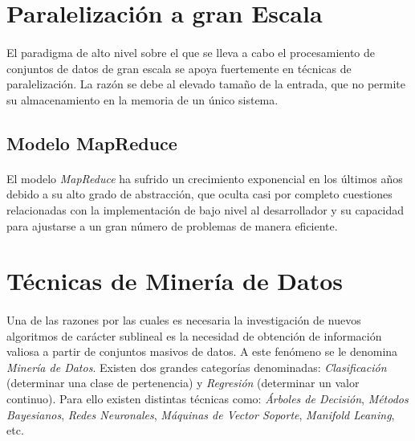 \documentclass[a4paper]{article}
\begin{document}
  \section{Paralelización a gran Escala}

    \paragraph{}
    El paradigma de alto nivel sobre el que se lleva a cabo el procesamiento de conjuntos de datos de gran escala se apoya fuertemente en técnicas de paralelización. La razón se debe al elevado tamaño de la entrada, que no permite su almacenamiento en la memoria de un único sistema.

    \subsection{Modelo MapReduce}

      \paragraph{}
      El modelo \emph{MapReduce} ha sufrido un crecimiento exponencial en los últimos años debido a su alto grado de abstracción, que oculta casi por completo cuestiones relacionadas con la implementación de bajo nivel al desarrollador y su capacidad para ajustarse a un gran número de problemas de manera eficiente.

  \section{Técnicas de Minería de Datos}

    \paragraph{}
    Una de las razones por las cuales es necesaria la investigación de nuevos algoritmos de carácter sublineal es la necesidad de obtención de información valiosa a partir de conjuntos masivos de datos. A este fenómeno se le denomina \emph{Minería de Datos}. Existen dos grandes categorías denominadas: \emph{Clasificación} (determinar una clase de pertenencia) y \emph{Regresión} (determinar un valor continuo). Para ello existen distintas técnicas como: \emph{Árboles de Decisión}, \emph{Métodos Bayesianos}, \emph{Redes Neuronales}, \emph{Máquinas de Vector Soporte}, \emph{Manifold Leaning}, etc.
\end{document}
